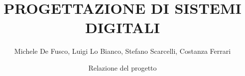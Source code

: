 \documentclass[12 pt]{report}
\begin{document}
\title{PROGETTAZIONE DI SISTEMI DIGITALI}

\author{Michele De Fusco, Luigi Lo Bianco, Stefano Scarcelli, Costanza Ferrari}
\date{Relazione del progetto}
\maketitle


\tableofcontents








\end{document}

